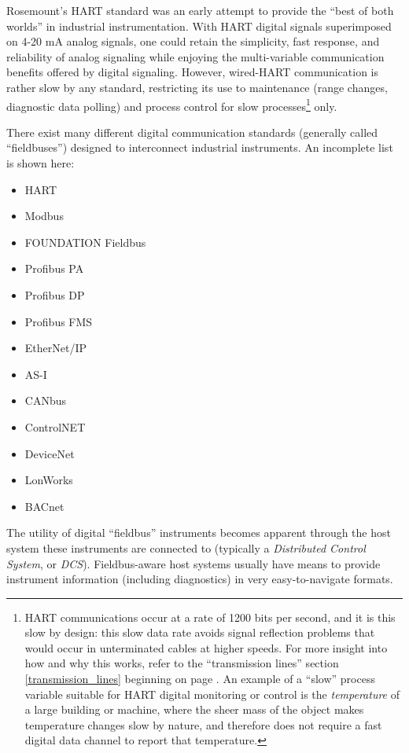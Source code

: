 Rosemount's HART standard was an early attempt to provide the ``best of both worlds'' in industrial instrumentation.  With HART digital signals superimposed on 4-20 mA analog signals, one could retain the simplicity, fast response, and reliability of analog signaling while enjoying the multi-variable communication benefits offered by digital signaling.  However, wired-HART communication is rather slow by any standard, restricting its use to maintenance (range changes, diagnostic data polling) and process control for slow processes\footnote{HART communications occur at a rate of 1200 bits per second, and it is this slow by design: this slow data rate avoids signal reflection problems that would occur in unterminated cables at higher speeds.  For more insight into how and why this works, refer to the ``transmission lines'' section \ref{transmission_lines} beginning on page \pageref{transmission_lines}.  An example of a ``slow'' process variable suitable for HART digital monitoring or control is the \textit{temperature} of a large building or machine, where the sheer mass of the object makes temperature changes slow by nature, and therefore does not require a fast digital data channel to report that temperature.} only.   

\filbreak

There exist many different digital communication standards (generally called ``fieldbuses'') designed to interconnect industrial instruments.  An incomplete list is shown here: 

\begin{itemize}
\item HART
\item Modbus
\item FOUNDATION Fieldbus
\item Profibus PA
\item Profibus DP
\item Profibus FMS
\item EtherNet/IP
\item AS-I
\item CANbus
\item ControlNET
\item DeviceNet
\item LonWorks
\item BACnet
\end{itemize}

The utility of digital ``fieldbus'' instruments becomes apparent through the host system these instruments are connected to (typically a \textit{Distributed Control System}, or \textit{DCS}).  Fieldbus-aware host systems usually have means to provide instrument information (including diagnostics) in very easy-to-navigate formats.  

